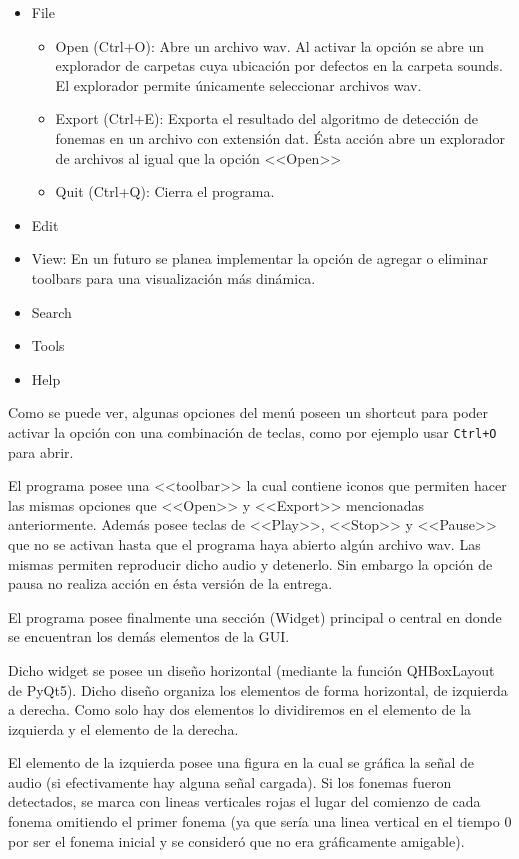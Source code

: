 \documentclass{article}
\begin{document}
\begin{itemize}
  \item File
  \begin{itemize}
      \item Open (Ctrl+O): Abre un archivo wav. Al activar la opción se abre un explorador de carpetas cuya ubicación por defectos en la carpeta sounds. El explorador permite únicamente seleccionar archivos wav.
      \item Export (Ctrl+E): Exporta el resultado del algoritmo de detección de fonemas en un archivo con extensión dat. Ésta acción abre un explorador de archivos al igual que la opción <<Open>>
      \item Quit (Ctrl+Q): Cierra el programa.
  \end{itemize}
  \item Edit
  \item View: En un futuro se planea implementar la opción de agregar o eliminar toolbars para una visualización más dinámica.
  \item Search
  \item Tools
  \item Help
\end{itemize}

Como se puede ver, algunas opciones del menú poseen un shortcut para poder activar la opción con una combinación de teclas, como por ejemplo usar \texttt{Ctrl+O} para abrir. 

El programa posee una <<toolbar>> la cual contiene iconos que permiten hacer las mismas opciones que <<Open>> y <<Export>> mencionadas anteriormente. Además posee teclas de <<Play>>, <<Stop>> y <<Pause>> que no se activan hasta que el programa haya abierto algún archivo wav. Las mismas permiten reproducir dicho audio y detenerlo. Sin embargo la opción de pausa no realiza acción en ésta versión de la entrega.

El programa posee finalmente una sección (Widget) principal o central en donde se encuentran los demás elementos de la GUI.

Dicho widget se posee un diseño horizontal (mediante la función QHBoxLayout de PyQt5). Dicho diseño organiza los elementos de forma horizontal, de izquierda a derecha. Como solo hay dos elementos lo dividiremos en el elemento de la izquierda y el elemento de la derecha.

El elemento de la izquierda posee una figura en la cual se gráfica la señal de audio (si efectivamente hay alguna señal cargada). Si los fonemas fueron detectados, se marca con lineas verticales rojas el lugar del comienzo de cada fonema omitiendo el primer fonema (ya que sería una linea vertical en el tiempo 0 por ser el fonema inicial y se consideró que no era gráficamente amigable).
\end{document}
